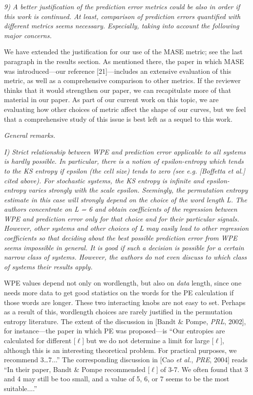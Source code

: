 \documentclass[12pt]{article}
\begin{document}
\smallskip

\emph{9) A better justification of the prediction error metrics could
  be also in order if this work is continued. At least, comparison of
  prediction errors quantified with different metrics seems
  necessary. Especially, taking into account the following major
  concerns.}

We have extended the justification for our use of the MASE metric; see
the last paragraph in the results section.  As mentioned there, the
paper in which MASE was introduced---our reference [21]---includes an
extensive evaluation of this metric, as well as a comprehensive
comparison to other metrics.  If the reviewer thinks that it would
strengthen our paper, we can recapitulate more of that material in our
paper.  As part of our current work on this topic, we are evaluating
how other choices of metric affect the shape of our curves, but we
feel that a comprehensive study of this issue is best left as a sequel
to this work.

\smallskip

\noindent\emph{General remarks.}

\emph{I) Strict relationship between WPE and prediction error
  applicable to all systems is hardly possible. In particular, there
  is a notion of epsilon-entropy which tends to the KS entropy if
  epsilon (the cell size) tends to zero (see e.g.  [Boffetta et al.]
  cited above). For stochastic systems, the KS entropy is infinite and
  epsilon-entropy varies strongly with the scale epsilon. Seemingly,
  the permutation entropy estimate in this case will strongly depend
  on the choice of the word length L. The authors concentrate on L = 6
  and obtain coefficients of the regression between WPE and prediction
  error only for that choice and for their particular
  signals. However, other systems and other choices of L may easily
  lead to other regression coefficients so that deciding about the
  best possible prediction error from WPE seems impossible in
  general. It is good if such a decision is possible for a certain
  narrow class of systems. However, the authors do not even discuss to
  which class of systems their results apply.}

WPE values depend not only on wordlength, but also on \emph{data}
length, since one needs more data to get good statistics on the words
for the PE calculation if those words are longer.  These two
interacting knobs are not easy to set.  Perhaps as a result of this,
wordlength choices are rarely justified in the permutation entropy
literature.  The extent of the discussion in [Bandt \& Pompe, {\sl
    PRL}, 2002], for instance---the paper in which PE was
proposed---is ``Our entropies are calculated for different [$\ell$]
but we do not determine a limit for large [$\ell$], although this is
an interesting theoretical problem. For practical purposes, we
recommend 3\dots7...''  The corresponding discussion in [Cao {\sl et
    al.}, {\sl PRE}, 2004] reads ``In their paper, Bandt \& Pompe
recommended [$\ell$] of 3-7.  We often found that 3 and 4 may still be
too small, and a value of 5, 6, or 7 seems to be the most
suitable....''
\end{document}
